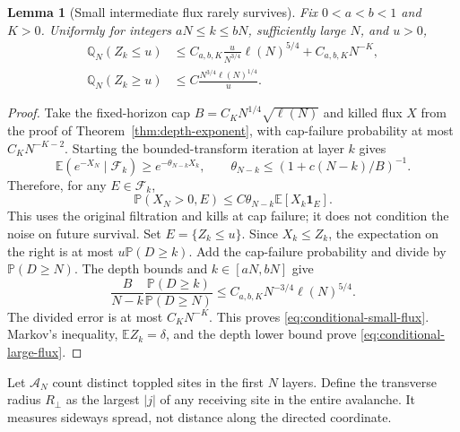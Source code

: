 \documentclass[11pt]{article}
\numberwithin{equation}{section}
\newtheorem{lemma}[theorem]{Lemma}
\theoremstyle{definition}
\newcommand{\E}{\mathbb E}
\newcommand{\Prob}{\mathbb P}
\newcommand{\ind}{\mathbf 1}
\begin{document}
\begin{lemma}[Small intermediate flux rarely survives]\label{lem:conditional-flux}
Fix $0<a<b<1$ and $K>0$. Uniformly for integers $aN\le k\le bN$, sufficiently large $N$, and $u>0$,
\begin{align}
 \mathbb Q_N(Z_k\le u)
 &\le C_{a,b,K}\frac{u}{N^{3/4}}\ell(N)^{5/4}
       +C_{a,b,K}N^{-K},\label{eq:conditional-small-flux}\\
 \mathbb Q_N(Z_k\ge u)
 &\le C\frac{N^{3/4}\ell(N)^{1/4}}u.\label{eq:conditional-large-flux}
\end{align}
\end{lemma}
\begin{proof}
Take the fixed-horizon cap $B=C_KN^{1/4}\sqrt{\ell(N)}$ and killed flux $X$ from the proof of Theorem~\ref{thm:depth-exponent}, with cap-failure probability at most $C_KN^{-K-2}$. Starting the bounded-transform iteration at layer $k$ gives
\[
 \E(e^{-X_N}\mid\mathcal F_k)\ge e^{-\theta_{N-k}X_k},
 \qquad \theta_{N-k}\le(1+c(N-k)/B)^{-1}.
\]
Therefore, for any $E\in\mathcal F_k$,
\begin{equation}\label{eq:conditional-survival-budget}
 \Prob(X_N>0,E)\le C\theta_{N-k}\E[X_k\ind_E].
\end{equation}
This uses the original filtration and kills at cap failure; it does not condition the noise on future survival. Set $E=\{Z_k\le u\}$. Since $X_k\le Z_k$, the expectation on the right is at most $u\Prob(D\ge k)$. Add the cap-failure probability and divide by $\Prob(D\ge N)$. The depth bounds and $k\in[aN,bN]$ give
\[
 \frac{B}{N-k}\frac{\Prob(D\ge k)}{\Prob(D\ge N)}
 \le C_{a,b,K}N^{-3/4}\ell(N)^{5/4}.
\]
The divided error is at most $C_KN^{-K}$. This proves \eqref{eq:conditional-small-flux}. Markov's inequality, $\E Z_k=\delta$, and the depth lower bound prove \eqref{eq:conditional-large-flux}.
\end{proof}

Let $\mathcal A_N$ count distinct toppled sites in the first $N$ layers. Define the transverse radius $R_\perp$ as the largest $|j|$ of any receiving site in the entire avalanche. It measures sideways spread, not distance along the directed coordinate.
\end{document}
